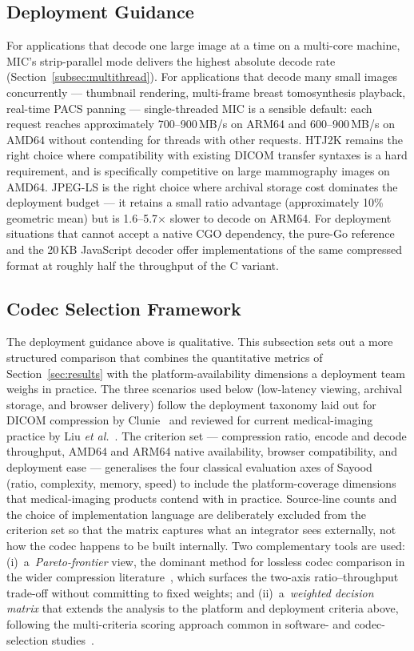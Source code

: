 \documentclass[journal]{IEEEtran}
\begin{document}
\subsection{Deployment Guidance}

For applications that decode one large image at a time on a multi-core
machine, MIC's strip-parallel mode delivers the highest absolute decode
rate (Section~\ref{subsec:multithread}). For applications that decode
many small images concurrently --- thumbnail rendering, multi-frame
breast tomosynthesis playback, real-time PACS panning --- single-threaded
MIC is a sensible default: each request reaches approximately
700--900\,MB/s on ARM64 and 600--900\,MB/s on AMD64 without contending
for threads with other requests. HTJ2K remains the right choice where
compatibility with existing DICOM transfer syntaxes is a hard
requirement, and is specifically competitive on large mammography images
on AMD64. JPEG-LS is the right choice where archival storage cost
dominates the deployment budget --- it retains a small ratio advantage
(approximately 10\% geometric mean) but is 1.6--5.7$\times$ slower to
decode on ARM64. For deployment situations that cannot accept a native
CGO dependency, the pure-Go reference and the 20\,KB JavaScript decoder
offer implementations of the same compressed format at roughly half the
throughput of the C variant.

\subsection{Codec Selection Framework}
\label{subsec:selection-framework}

The deployment guidance above is qualitative. This subsection sets out
a more structured comparison that combines the quantitative metrics of
Section~\ref{sec:results} with the platform-availability dimensions a
deployment team weighs in practice. The three scenarios used below
(low-latency viewing, archival storage, and browser delivery) follow
the deployment taxonomy laid out for DICOM compression by
Clunie~\cite{clunie_miit2009} and reviewed for current medical-imaging
practice by Liu \textit{et al.}~\cite{liu2017}. The criterion set ---
compression ratio, encode and decode throughput, AMD64 and ARM64
native availability, browser compatibility, and deployment ease ---
generalises the four classical evaluation axes of
Sayood~\cite{sayood} (ratio, complexity, memory, speed) to include the
platform-coverage dimensions that medical-imaging products contend with
in practice. Source-line counts and the choice of implementation
language are deliberately excluded from the criterion set so that the
matrix captures what an integrator sees externally, not how the codec
happens to be built internally. Two complementary tools are used:
(i)~a~\textit{Pareto-frontier} view, the dominant method for lossless
codec comparison in the wider compression literature~\cite{geldreich_pareto,
jpegxl_pareto, fcbench}, which surfaces the two-axis ratio--throughput
trade-off without committing to fixed weights; and (ii)~a~\textit{weighted
decision matrix} that extends the analysis to the platform and
deployment criteria above, following the multi-criteria scoring approach
common in software- and codec-selection studies~\cite{lossless_unified_score,
saaty_ahp}.
\end{document}
